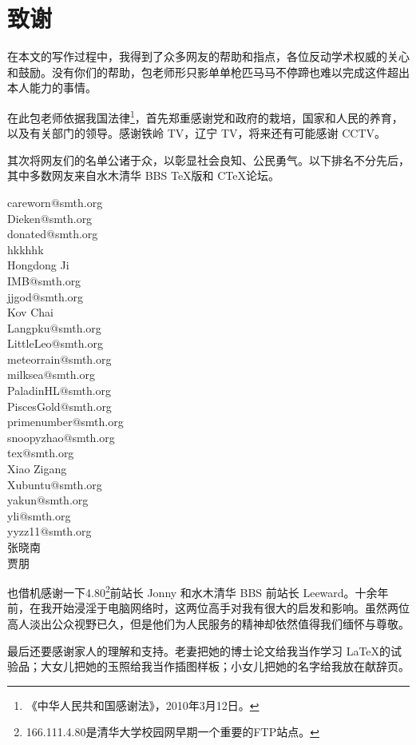 \chapter{致谢}

在本文的写作过程中，我得到了众多网友的帮助和指点，各位反动学术权威的关心和鼓励。没有你们的帮助，包老师形只影单单枪匹马马不停蹄也难以完成这件超出本人能力的事情。

在此包老师依据我国法律\footnote{《中华人民共和国感谢法》，2010年3月12日。}，首先郑重感谢党和政府的栽培，国家和人民的养育，以及有关部门的领导。感谢铁岭 TV，辽宁 TV，将来还有可能感谢 CCTV。

其次将网友们的名单公诸于众，以彰显社会良知、公民勇气。以下排名不分先后，其中多数网友来自水木清华 BBS \TeX 版和 C\TeX 论坛。

\begin{multicols}{2}
\noindent
careworn$@$smth.org\\
Dieken$@$smth.org\\
donated$@$smth.org\\
hkkhhk\\
Hongdong Ji\\
IMB$@$smth.org\\
jjgod$@$smth.org\\
Kov Chai\\
Langpku$@$smth.org\\
LittleLeo$@$smth.org\\
meteorrain$@$smth.org\\
milksea$@$smth.org\\
PaladinHL$@$smth.org\\
PiscesGold$@$smth.org\\
primenumber$@$smth.org\\
snoopyzhao$@$smth.org\\
tex$@$smth.org\\
Xiao Zigang\\
Xubuntu$@$smth.org\\
yakun$@$smth.org\\
yli$@$smth.org\\
yyzz11$@$smth.org\\
张晓南\\
贾朋
\end{multicols}

也借机感谢一下4.80\footnote{166.111.4.80是清华大学校园网早期一个重要的FTP站点。}前站长 Jonny 和水木清华 BBS 前站长 Leeward。十余年前，在我开始浸淫于电脑网络时，这两位高手对我有很大的启发和影响。虽然两位高人淡出公众视野已久，但是他们为人民服务的精神却依然值得我们缅怀与尊敬。

最后还要感谢家人的理解和支持。老妻把她的博士论文给我当作学习 \LaTeX 的试验品；大女儿把她的玉照给我当作插图样板；小女儿把她的名字给我放在献辞页。